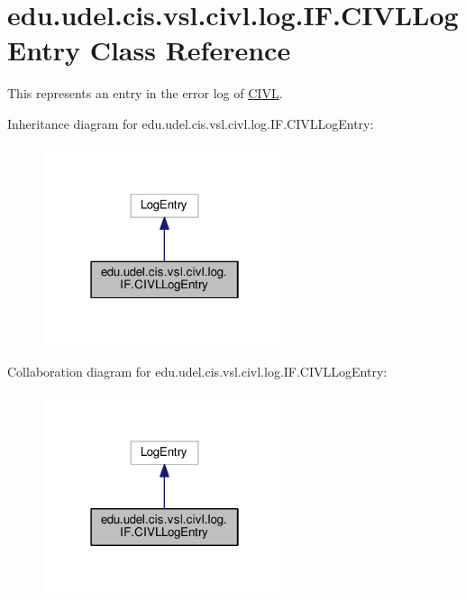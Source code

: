 \hypertarget{classedu_1_1udel_1_1cis_1_1vsl_1_1civl_1_1log_1_1IF_1_1CIVLLogEntry}{}\section{edu.\+udel.\+cis.\+vsl.\+civl.\+log.\+I\+F.\+C\+I\+V\+L\+Log\+Entry Class Reference}
\label{classedu_1_1udel_1_1cis_1_1vsl_1_1civl_1_1log_1_1IF_1_1CIVLLogEntry}


This represents an entry in the error log of \hyperlink{classedu_1_1udel_1_1cis_1_1vsl_1_1civl_1_1CIVL}{C\+I\+V\+L}.  




Inheritance diagram for edu.\+udel.\+cis.\+vsl.\+civl.\+log.\+I\+F.\+C\+I\+V\+L\+Log\+Entry\+:
\nopagebreak
\begin{figure}[H]
\begin{center}
\leavevmode
\includegraphics[width=202pt]{classedu_1_1udel_1_1cis_1_1vsl_1_1civl_1_1log_1_1IF_1_1CIVLLogEntry__inherit__graph}
\end{center}
\end{figure}


Collaboration diagram for edu.\+udel.\+cis.\+vsl.\+civl.\+log.\+I\+F.\+C\+I\+V\+L\+Log\+Entry\+:
\nopagebreak
\begin{figure}[H]
\begin{center}
\leavevmode
\includegraphics[width=202pt]{classedu_1_1udel_1_1cis_1_1vsl_1_1civl_1_1log_1_1IF_1_1CIVLLogEntry__coll__graph}
\end{center}
\end{figure}
